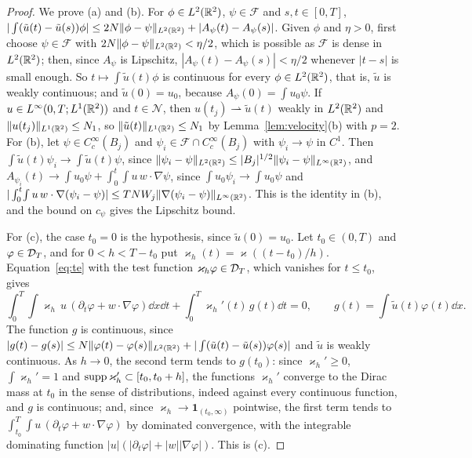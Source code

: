 \begin{proof}
We prove (a) and (b). For $\phi\in L^2(\mathbb{R}^2)$, $\psi\in\mathcal F$ and $s,t\in[0,T]$,
$|\int(\tilde u(t)-\tilde u(s))\phi|\le2N\|\phi-\psi\|_{L^2(\mathbb{R}^2)}+|A_\psi(t)-A_\psi(s)|$.
Given $\phi$ and $\eta>0$, first choose $\psi\in\mathcal F$ with
$2N\|\phi-\psi\|_{L^2(\mathbb{R}^2)}<\eta/2$, which is possible as $\mathcal F$ is dense in $L^2(\mathbb{R}^2)$;
then, since $A_\psi$ is Lipschitz, $|A_\psi(t)-A_\psi(s)|<\eta/2$ whenever
$|t-s|$ is small enough. So $t\mapsto\int\tilde u(t)\phi$ is continuous for every
$\phi\in L^2(\mathbb{R}^2)$, that is, $\tilde u$ is weakly continuous; and $\tilde u(0)=u_0$, because
$A_\psi(0)=\int u_0\psi$. If $u\in L^\infty(0,T;L^1(\mathbb{R}^2))$ and $t\in\mathcal N$, then
$u(t_j)\rightharpoonup\tilde u(t)$ weakly in $L^2(\mathbb{R}^2)$ and $\|u(t_j)\|_{L^1(\mathbb{R}^2)}\le N_1$,
so $\|\tilde u(t)\|_{L^1(\mathbb{R}^2)}\le N_1$ by Lemma~\ref{lem:velocity}(b) with $p=2$. For
(b), let $\psi\in C_c^\infty(B_j)$ and $\psi_i\in\mathcal F\cap C_c^\infty(B_j)$
with $\psi_i\to\psi$ in $C^1$. Then $\int\tilde u(t)\psi_i\to\int\tilde u(t)\psi$,
since $\|\psi_i-\psi\|_{L^2(\mathbb{R}^2)}\le|B_j|^{1/2}\|\psi_i-\psi\|_{L^\infty(\mathbb{R}^2)}$, and
$A_{\psi_i}(t)\to\int u_0\psi+\int_0^t\!\int u\,w\cdot\nabla\psi$, since
$\int u_0\psi_i\to\int u_0\psi$ and
$|\int_0^t\!\int u\,w\cdot\nabla(\psi_i-\psi)|\le TNW_j\|\nabla(\psi_i-\psi)\|_{L^\infty(\mathbb{R}^2)}$. This is the
identity in (b), and the bound on $c_\psi$ gives the Lipschitz bound.

For (c), the case $t_0=0$ is the hypothesis, since $\tilde u(0)=u_0$. Let $t_0\in(0,T)$ and
$\varphi\in\mathcal{D}_T$, and for $0<h<T-t_0$ put $\varkappa_h(t)=\varkappa((t-t_0)/h)$.
Equation~\eqref{eq:te} with the test function $\varkappa_h\varphi\in\mathcal{D}_T$, which
vanishes for $t\le t_0$, gives
\[
\int_0^T\!\!\int\varkappa_h\,u\,(\partial_t\varphi+w\cdot\nabla\varphi)\dd x\dd t
+\int_0^T\varkappa_h'(t)\,g(t)\dd t=0,\qquad g(t)=\int\tilde u(t)\varphi(t)\dd x .
\]
The function $g$ is continuous, since
$|g(t)-g(s)|\le N\|\varphi(t)-\varphi(s)\|_{L^2(\mathbb{R}^2)}+|\int(\tilde u(t)-\tilde u(s))\varphi(s)|$
and $\tilde u$ is weakly continuous. As $h\to0$, the second term tends to $g(t_0)$: since $\varkappa_h'\ge0$,
$\int\varkappa_h'=1$ and $\operatorname{supp}\varkappa_h'\subset[t_0,t_0+h]$, the functions
$\varkappa_h'$ converge to the Dirac mass at $t_0$ in the sense of distributions,
indeed against every continuous function, and $g$ is continuous; and, since
$\varkappa_h\to\mathbf 1_{(t_0,\infty)}$ pointwise, the first term tends to $\int_{t_0}^T\!\int u\,(\partial_t\varphi+w\cdot\nabla\varphi)$ by
dominated convergence, with the integrable dominating function
$|u|(|\partial_t\varphi|+|w||\nabla\varphi|)$. This is (c).
\end{proof}

